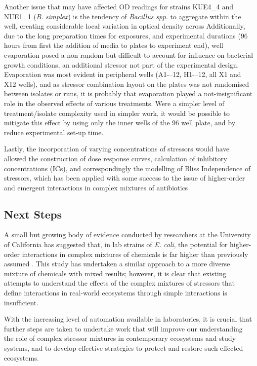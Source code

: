 \documentclass[final,1p,times]{elsarticle}
\begin{document}
Another issue that may have affected OD readings for strains KUE4\_4 and NUE1\_1 (\textit{B. simplex}) is the tendency of \textit{Bacillus spp.} to aggregate within the well, creating considerable local variation in optical density across 
Additionally, due to the long preparation times for exposures, and experimental durations (96 hours from first the addition of media to plates to experiment end), well evaporation posed a non-random but difficult to account for influence on bacterial growth conditions, an additional stressor not part of the experimental design. Evaporation was most evident in peripheral wells (A1-–12, H1-–12, all X1 and X12 wells), and as stressor combination layout on the plates was not randomised between isolates or runs, it is probably that evaporation played a not-insignificant role in the observed effects of various treatments. Were a simpler level of treatment/isolate complexity used in simpler work, it would be possible to mitigate this effect by using only the inner wells of the 96 well plate, and by reduce experimental set-up time. 

Lastly, the incorporation of varying concentrations of stressors would have allowed the construction of dose response curves, calculation of inhibitory concentrations (ICs), and correspondingly the modelling of Bliss Independence \cite{Bliss1939} of stressors, which has been applied with some success to the issue of higher-order and emergent interactions in complex mixtures of antibiotics \cite{Beppler2016,Tekin2017a} 
\subsection{Next Steps}
\label{S:4:4}

A small but growing body of evidence conducted by researchers at the University of California has suggested that, in lab strains of \textit{E. coli}, the potential for higher-order interactions in complex mixtures of chemicals is far higher than previously assumed \cite{Beppler2016,Tekin2016,Tekin2017a}.  This study has undertaken a similar approach to a more diverse mixture of chemicals with mixed results; however, it is clear that existing attempts to understand the effects of the complex mixtures of stressors that define interactions in real-world ecosystems through simple interactions is insufficient.

With the increasing level of automation available in laboratories, it is crucial that further steps are taken to undertake work that will improve our understanding the role of complex stressor mixtures in contemporary ecosystems and study systems, and to develop effective strategies to protect and restore such effected ecosystems.
\end{document}
